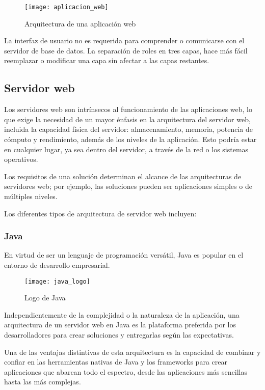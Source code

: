 \begin{figure}[htp!]
  \centering
  \texttt{[image: aplicacion\_web]}
  \caption{Arquitectura de una aplicación web}
  \label{fig:aplicacion_web}
\end{figure}

La interfaz de usuario no es requerida para comprender o comunicarse con el servidor de base de datos. La separación de roles en tres capas, hace más fácil reemplazar o modificar una capa sin afectar a las capas restantes.

\subsection{Servidor web}

Los servidores web son intrínsecos al funcionamiento de las aplicaciones web, lo que exige la necesidad de un mayor énfasis en la arquitectura del servidor web, incluida la capacidad física del servidor: almacenamiento, memoria, potencia de cómputo y rendimiento, además de los niveles de la aplicación. Esto podría estar en cualquier lugar, ya sea dentro del servidor, a través de la red o los sistemas operativos.

Los requisitos de una solución determinan el alcance de las arquitecturas de servidores web; por ejemplo, las soluciones pueden ser aplicaciones simples o de múltiples niveles.

Los diferentes tipos de arquitectura de servidor web incluyen:

\subsubsection{Java}

En virtud de ser un lenguaje de programación versátil, Java es popular en el entorno de desarrollo empresarial.

\begin{figure}[htp!]
  \centering
  \texttt{[image: java\_logo]}
  \caption{Logo de Java}
  \label{fig:java_logo}
\end{figure}

Independientemente de la complejidad o la naturaleza de la aplicación, una arquitectura de un servidor web en Java es la plataforma preferida por los desarrolladores para crear soluciones y entregarlas según las expectativas.

Una de las ventajas distintivas de esta arquitectura es la capacidad de combinar y confiar en las herramientas nativas de Java y los frameworks para crear aplicaciones que abarcan todo el espectro, desde las aplicaciones más sencillas hasta las más complejas.

